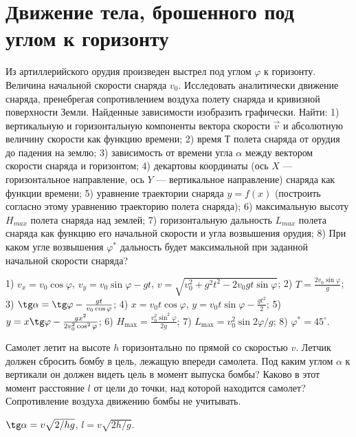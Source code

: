 \section{Движение тела, брошенного под углом к горизонту}

\introProblems

\begin{ex} %
Из артиллерийского орудия произведен выстрел под углом $\varphi$ к горизонту. Величина начальной скорости снаряда $v_0$. Исследовать аналитически движение снаряда, пренебрегая сопротивлением воздуха полету снаряда и кривизной поверхности Земли. Найденные зависимости изобразить графически. Найти: 1) вертикальную и горизонтальную компоненты вектора скорости $\vec{v}$ и абсолютную величину скорости как функцию времени; 2) время $Т$ полета снаряда от орудия до падения на землю; 3) зависимость от времени угла $\alpha$ между вектором скорости снаряда и горизонтом; 4) декартовы координаты (ось $X$ — горизонтальное направление, ось $Y$ — вертикальное направление) снаряда как функции времени; 5) уравнение траектории снаряда $y = f(x)$ (построить согласно этому уравнению траекторию полета снаряда); 6) максимальную высоту $H_{max}$ полета снаряда над землей; 7) горизонтальную дальность $L_{max}$ полета снаряда как функцию его начальной скорости и угла возвышения орудия; 8) При каком угле возвышения $\varphi^*$ дальность будет максимальной при заданной начальной скорости снаряда?
\begin{ans}
1) $v_x = v_0 \cos \varphi$, $v_y = v_0 \sin \varphi - gt$, $v = \sqrt{v_{0}^{2} + g^2 t^2 - 2v_{0}gt \sin \varphi}$; 2) $T = \frac{2v_{0}\sin \varphi}{g}$; 3) $ \tg \alpha = \tg \varphi - \frac{gt}{v_0 \cos \varphi}$; 4) $x = v_0 t \cos \varphi$, $y = v_0 t \sin \varphi - \frac{gt^2}{2}$; 5) $y = x \tg \varphi - \frac{gx^2}{2v_{0}^{2} \cos^2 \varphi} $; 6) $H_{\max} = \frac{v_{0}^{2} \sin^2 \varphi}{2g}$; 7) $L_{\max} = v_{0}^2 \sin 2 \varphi / g$; 8) $\varphi^{*} = 45^{\circ}$.
\end{ans}
\end{ex}	

\begin{ex} %
Самолет летит на высоте $h$ горизонтально по прямой со скоростью $v$. Летчик должен сбросить бомбу в цель, лежащую впереди самолета. Под каким углом $\alpha$ к вертикали он должен видеть цель в момент выпуска бомбы? Каково в этот момент расстояние $l$ от цели до точки, над которой находится самолет? Сопротивление воздуха движению бомбы не учитывать.
\begin{ans}
$\tg \alpha = v \sqrt{2/hg}$, $l = v \sqrt{2h/g}$.
\end{ans}
\end{ex}	

